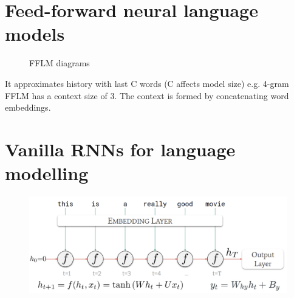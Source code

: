 \documentclass[11pt]{article}
\begin{document}
\section{Feed-forward neural language models}

\begin{figure}[H]
    \centering
    \caption{FFLM diagrams}\label{fig:fflm}
\end{figure}

It approximates history with last C words (C affects model size) e.g. 4-gram FFLM has a context size of 3. The context is formed by concatenating word embeddings.

\section{Vanilla RNNs for language modelling}

\begin{figure}[H]
    \centering
    \includegraphics[width=\linewidth]{figures/Rnn-architecture.png}
\end{figure}
\end{document}
